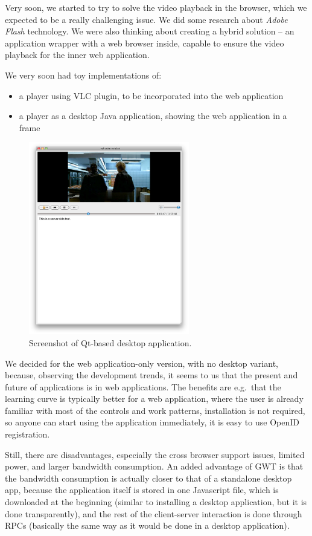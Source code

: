 Very soon, we started to try to solve the video playback in the browser, which we expected to be a really challenging issue. We did some research about \emph{Adobe Flash} technology. We were also thinking about creating a hybrid solution -- an application wrapper with a web browser inside, capable to ensure the video playback for the inner web application.

We very soon had toy implementations of:

\begin{itemize}
\item a player using VLC plugin, to be incorporated into the web application
\item a player as a desktop Java application, showing the web application in a frame
\end{itemize}

\begin{figure}[h!]
	\centering
		\includegraphics[width=7cm]{figures/desktop-app-player.png}
	\caption{Screenshot of Qt-based desktop application.}
	\label{fig:figures_desktop-app-player}
\end{figure}

We decided for the web application-only version, with no desktop variant, because, observing the development trends, it seems to us that the present and future of applications is in web applications. The benefits are e.g.\ that the learning curve is typically better for a web application, where the user is already familiar with most of the controls and work patterns, installation is not required, so anyone can start using the application immediately, it is easy to use OpenID registration.

Still, there are disadvantages, especially the cross browser support issues, limited power, and larger bandwidth consumption.
An added advantage of GWT is that the bandwidth consumption is actually closer to that of a standalone desktop app, because the application itself is stored in one Javascript file, which is downloaded at the beginning (similar to installing a desktop application, but it is done transparently), and the rest of the client-server interaction is done through RPCs (basically the same way as it would be done in a desktop application).

